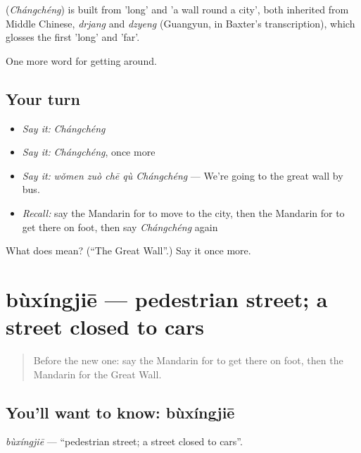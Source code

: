\begin{cousinweb}
\textbf{} (\emph{Chángchéng}) is built from  'long' and  'a wall round a city', both inherited from Middle Chinese, \emph{drjang} and \emph{dzyeng} (Guangyun, in Baxter's transcription), which glosses the first 'long' and 'far'.
\end{cousinweb}

\begin{grammarlens}[title={What you've built}]
One more word for getting around.
\end{grammarlens}

\subsection*{Your turn}
\begin{itemize}
\raggedright
  \item \emph{Say it:} \emph{Chángchéng}
  \item \emph{Say it:} \emph{Chángchéng}, once more
  \item \emph{Say it:} \emph{wǒmen zuò chē qù Chángchéng} — We're going to the great wall by bus.
  \item \emph{Recall:} say the Mandarin for to move to the city, then the Mandarin for to get there on foot, then say \emph{Chángchéng} again
\end{itemize}

\begin{tcolorbox}[breakable,colback=teal!4,colframe=teal!35!black,title={Before you move on}]
What does  mean? (\textquotedblleft{}The Great Wall\textquotedblright{}.) Say it once more.
\end{tcolorbox}
\section[bùxíngjiē]{bùxíngjiē — pedestrian street; a street closed to cars}

\label{lesson:ZH-C447-buxingjie}



\begin{quote}
Before the new one: say the Mandarin for to get there on foot, then the Mandarin for the Great Wall.
\end{quote}

\subsection*{You'll want to know: bùxíngjiē}
\emph{bùxíngjiē} — \textquotedblleft{}pedestrian street; a street closed to cars\textquotedblright{}.

